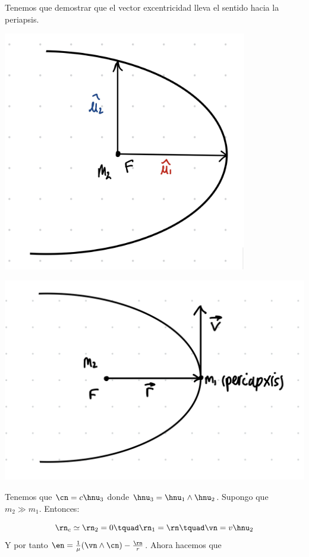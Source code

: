     Tenemos que demostrar que el vector excentricidad lleva el sentido hacia la periapsis.


    \begin{minipage}{.45\textwidth} 	
        \includegraphics[width=0.8\textwidth]{Cuerpo/Imagenes/02_Ejercicio_1_1.jpg}
    \end{minipage}	\hfill
    \begin{minipage}{0.45\textwidth}
        \includegraphics[width=1.0\textwidth]{Cuerpo/Imagenes/02_Ejercicio_1_2.png}
    \end{minipage}

    Tenemos que $\cn=c\hnu_3$ donde $\hnu_3=\hnu_1\wedge\hnu_2$. Supongo que $m_2\gg m_1$. Entonces:

    \begin{equation}
        \rn_c \simeq \rn_2 = 0 \tquad \rn_1 = \rn \tquad \vn = v \hnu_2
    \end{equation}
    Y por tanto $\en=\frac{1}{\mu} (\vn \wedge \cn) - \frac{\rn}{r}$. Ahora hacemos que

